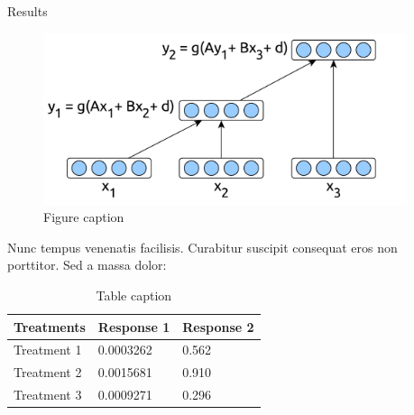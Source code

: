 \documentclass[final]{beamer}
\newlength{\sepwid}
\newlength{\onecolwid}
\newlength{\twocolwid}
\begin{document}
\begin{frame}[t]
\begin{columns}[t]
\begin{column}{\twocolwid}
\begin{columns}[t,totalwidth=\twocolwid]
\begin{column}{\onecolwid}
          \begin{block}{Results}

            \begin{figure}
              \includegraphics[width=0.8\linewidth]{fig2.pdf}
              \caption{Figure caption}
            \end{figure}

            Nunc tempus venenatis facilisis. Curabitur suscipit consequat eros
            non porttitor. Sed a massa dolor:

            \begin{table}
              \vspace{2ex}
              \begin{tabular}{l l l}
                \toprule
                \textbf{Treatments} & \textbf{Response 1} & \textbf{Response 2}\\
                \midrule
                Treatment 1 & 0.0003262 & 0.562 \\
                Treatment 2 & 0.0015681 & 0.910 \\
                Treatment 3 & 0.0009271 & 0.296 \\
                \bottomrule
              \end{tabular}
              \caption{Table caption}
            \end{table}

          \end{block}


        \end{column} %

      \end{columns} %

    \end{column} %

  \begin{column}{\sepwid}\end{column} %


\end{columns}
\end{frame}
\end{document}
